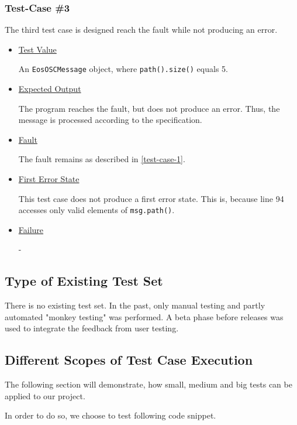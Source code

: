 \documentclass{scrreprt}
\begin{document}
\subsubsection{Test-Case \#3}
\label{test-case-3}

The third test case is designed reach the fault while not producing an error.

\begin{itemize}
	\item[] \underline{Test Value}
	
	An \texttt{EosOSCMessage} object, where \texttt{path().size()} equals 5.
	
	\item[] \underline{Expected Output}
	
	The program reaches the fault, but does not produce an error. Thus, the message is processed according to the specification.
	
	\item[] \underline{Fault}
	
	The fault remains as described in \vref{test-case-1}. 
	
	\item[] \underline{First Error State}
	
	This test case does not produce a first error state. This is, because line 94 accesses only valid elements of \texttt{msg.path()}.
	
	\item[] \underline{Failure}
	
	-
\end{itemize}

\subsection{Type of Existing Test Set}

There is no existing test set. In the past, only manual testing and partly automated "monkey testing" was performed. A beta phase before releases was used to integrate the feedback from user testing.

\subsection{Different Scopes of Test Case Execution}

The following section will demonstrate, how small, medium and big tests can be applied to our project.

In order to do so, we choose to test following code snippet.
\end{document}
